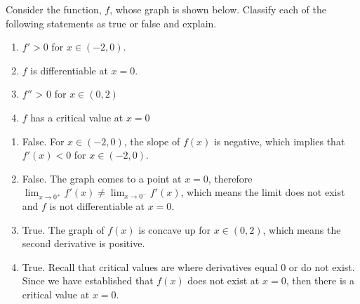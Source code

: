 \begin{Exercise} Consider the 
function, $f$, whose graph is shown below. Classify each of the following 
statements as true or false and explain. 
\begin{enumerate}
\item $f' > 0$ for $x \in (-2, 0)$.
\item $f$ is differentiable at $x = 0$.
\item $f''$ > 0 for $x \in (0, 2)$
\item $f$ has a critical value at $x = 0$
\end{enumerate}
\end{Exercise}

\begin{Answer}[ref = shape1]
\begin{enumerate}
\item False. For $x \in (-2, 0)$, the slope of $f(x)$ is negative, which 
implies that $f'(x) < 0$ for $x \in (-2, 0)$.
\item False. The graph comes to a point at $x = 0$, therefore $\lim_{x \to 
0^+} f'(x) \neq \lim_{x \to 0^-} f'(x)$, which means the limit does not 
exist and $f$ is not differentiable at $x = 0$.
\item True. The graph of $f(x)$ is concave up for $x \in (0, 2)$, which means 
the second derivative is positive. 
\item True. Recall that critical values are where derivatives equal 0 or do 
not exist. Since we have established that $f(x)$ does not exist at $x = 0$, 
then there is a critical value at $x = 0$. 
\end{enumerate}
\end{Answer}

